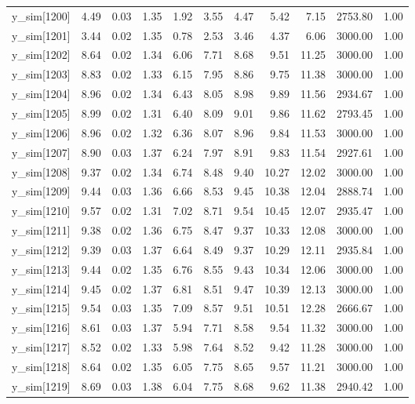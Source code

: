 \begin{table}[ht]
\begin{tabular}{rrrrrrrrrrr}
  y\_sim[1200] & 4.49 & 0.03 & 1.35 & 1.92 & 3.55 & 4.47 & 5.42 & 7.15 & 2753.80 & 1.00 \\ 
  y\_sim[1201] & 3.44 & 0.02 & 1.35 & 0.78 & 2.53 & 3.46 & 4.37 & 6.06 & 3000.00 & 1.00 \\ 
  y\_sim[1202] & 8.64 & 0.02 & 1.34 & 6.06 & 7.71 & 8.68 & 9.51 & 11.25 & 3000.00 & 1.00 \\ 
  y\_sim[1203] & 8.83 & 0.02 & 1.33 & 6.15 & 7.95 & 8.86 & 9.75 & 11.38 & 3000.00 & 1.00 \\ 
  y\_sim[1204] & 8.96 & 0.02 & 1.34 & 6.43 & 8.05 & 8.98 & 9.89 & 11.56 & 2934.67 & 1.00 \\ 
  y\_sim[1205] & 8.99 & 0.02 & 1.31 & 6.40 & 8.09 & 9.01 & 9.86 & 11.62 & 2793.45 & 1.00 \\ 
  y\_sim[1206] & 8.96 & 0.02 & 1.32 & 6.36 & 8.07 & 8.96 & 9.84 & 11.53 & 3000.00 & 1.00 \\ 
  y\_sim[1207] & 8.90 & 0.03 & 1.37 & 6.24 & 7.97 & 8.91 & 9.83 & 11.54 & 2927.61 & 1.00 \\ 
  y\_sim[1208] & 9.37 & 0.02 & 1.34 & 6.74 & 8.48 & 9.40 & 10.27 & 12.02 & 3000.00 & 1.00 \\ 
  y\_sim[1209] & 9.44 & 0.03 & 1.36 & 6.66 & 8.53 & 9.45 & 10.38 & 12.04 & 2888.74 & 1.00 \\ 
  y\_sim[1210] & 9.57 & 0.02 & 1.31 & 7.02 & 8.71 & 9.54 & 10.45 & 12.07 & 2935.47 & 1.00 \\ 
  y\_sim[1211] & 9.38 & 0.02 & 1.36 & 6.75 & 8.47 & 9.37 & 10.33 & 12.08 & 3000.00 & 1.00 \\ 
  y\_sim[1212] & 9.39 & 0.03 & 1.37 & 6.64 & 8.49 & 9.37 & 10.29 & 12.11 & 2935.84 & 1.00 \\ 
  y\_sim[1213] & 9.44 & 0.02 & 1.35 & 6.76 & 8.55 & 9.43 & 10.34 & 12.06 & 3000.00 & 1.00 \\ 
  y\_sim[1214] & 9.45 & 0.02 & 1.37 & 6.81 & 8.51 & 9.47 & 10.39 & 12.13 & 3000.00 & 1.00 \\ 
  y\_sim[1215] & 9.54 & 0.03 & 1.35 & 7.09 & 8.57 & 9.51 & 10.51 & 12.28 & 2666.67 & 1.00 \\ 
  y\_sim[1216] & 8.61 & 0.03 & 1.37 & 5.94 & 7.71 & 8.58 & 9.54 & 11.32 & 3000.00 & 1.00 \\ 
  y\_sim[1217] & 8.52 & 0.02 & 1.33 & 5.98 & 7.64 & 8.52 & 9.42 & 11.28 & 3000.00 & 1.00 \\ 
  y\_sim[1218] & 8.64 & 0.02 & 1.35 & 6.05 & 7.75 & 8.65 & 9.57 & 11.21 & 3000.00 & 1.00 \\ 
  y\_sim[1219] & 8.69 & 0.03 & 1.38 & 6.04 & 7.75 & 8.68 & 9.62 & 11.38 & 2940.42 & 1.00 \\ 

\end{tabular}
\end{table}
